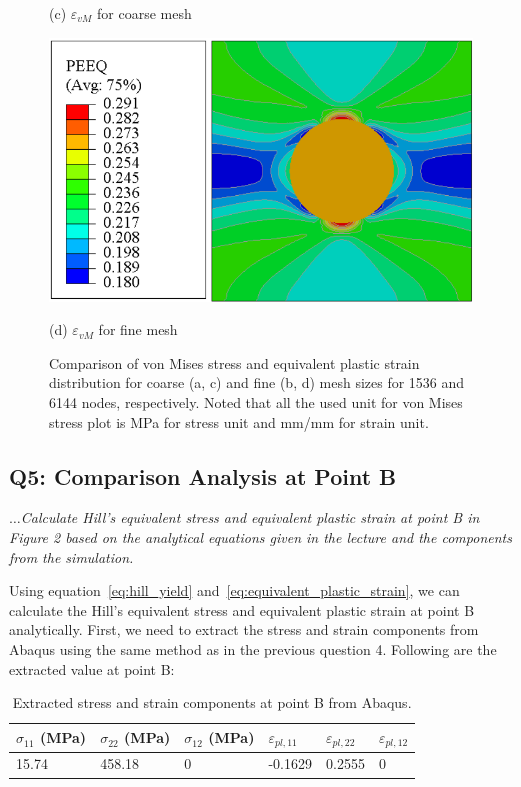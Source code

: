 \documentclass[12pt]{article}
\begin{document}
\begin{figure}[H]
\begin{minipage}{0.48\textwidth}
        \caption*{(c) $\varepsilon_{vM}$ for coarse mesh}
    \end{minipage}
    \hfill
    \begin{minipage}{0.48\textwidth}
        \centering
        \includegraphics[width=\textwidth]{images/PEEQ_Fine.png}
        \caption*{(d) $\varepsilon_{vM}$ for fine mesh}
    \end{minipage}
    \caption{Comparison of von Mises stress and equivalent plastic strain distribution 
    for coarse (a, c) and fine (b, d) mesh 
    sizes for 1536 and 6144 nodes, respectively. Noted that all the used unit for von Mises stress plot is MPa for stress unit 
    and mm/mm for strain unit.}
    \label{fig:stressFields}
\end{figure}

\newpage
\subsection*{Q5: Comparison Analysis at Point B}
\textit{$\dots$Calculate Hill’s equivalent stress and equivalent plastic strain at point B in Figure 2 based on
the analytical equations given in the lecture and the components from the simulation.}
\vspace{1em}

Using equation~\ref{eq:hill_yield} and~\ref{eq:equivalent_plastic_strain}, we can calculate the Hill's equivalent stress and 
equivalent plastic strain at point B analytically. First, we need to extract the stress and strain
components from Abaqus using the same method as in the previous question 4. Following are the extracted value
at point B:

\begin{table}[H]
    \centering
    \caption{Extracted stress and strain components at point B from Abaqus.}
    \label{tab:pointA-results}
    \begin{tabular}{llllll}
        \toprule
        $\sigma_{11}$ (MPa) & $\sigma_{22}$ (MPa) & $\sigma_{12}$ (MPa) & $\varepsilon_{pl,11}$ & $\varepsilon_{pl,22}$ & $\varepsilon_{pl,12}$\\
        \midrule
        15.74 & 458.18 & 0 & -0.1629 & 0.2555 & 0\\
        \bottomrule
    \end{tabular}
\end{table}
\end{document}
